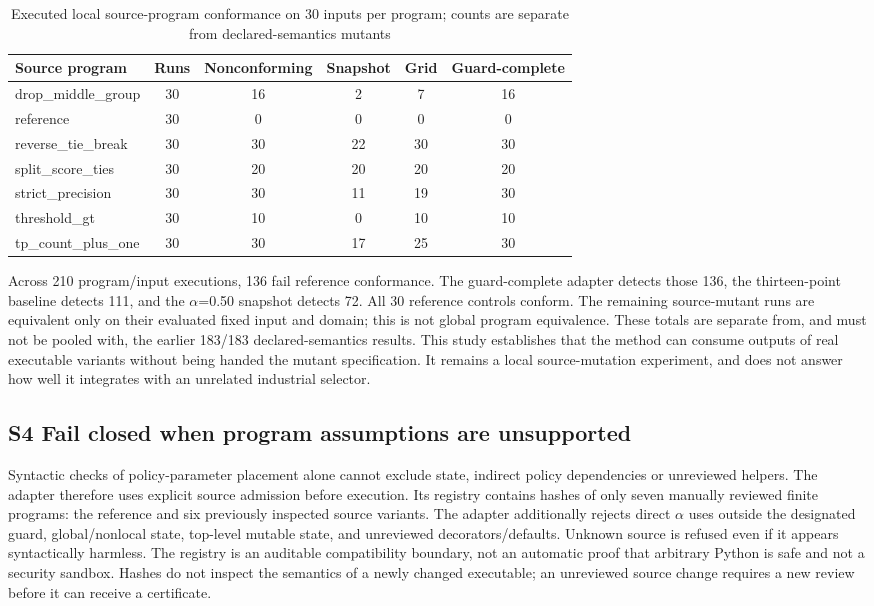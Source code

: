 \documentclass[11pt,a4paper]{article}
\theoremstyle{plain}
\theoremstyle{definition}
\theoremstyle{remark}
\begin{document}
\begin{table}[!htbp]
\caption{Executed local source-program conformance on 30 inputs per program; counts are separate from declared-semantics mutants}\label{tab:s1}
\centering
\footnotesize
\setlength{\tabcolsep}{3pt}
\renewcommand{\arraystretch}{1.15}
\begin{tabularx}{\textwidth}{@{} >{\raggedright\arraybackslash}X c c c c c @{}}
\toprule
\textbf{Source program} & \textbf{Runs} & \textbf{Nonconforming} & \textbf{Snapshot} & \textbf{Grid} & \textbf{Guard-complete} \\
\midrule
drop\_middle\_group & 30 & 16 & 2 & 7 & 16 \\
reference & 30 & 0 & 0 & 0 & 0 \\
reverse\_tie\_break & 30 & 30 & 22 & 30 & 30 \\
split\_score\_ties & 30 & 20 & 20 & 20 & 20 \\
strict\_precision & 30 & 30 & 11 & 19 & 30 \\
threshold\_gt & 30 & 10 & 0 & 10 & 10 \\
tp\_count\_plus\_one & 30 & 30 & 17 & 25 & 30 \\
\bottomrule
\end{tabularx}
\end{table}
\FloatBarrier

Across 210 program/input executions, 136 fail reference conformance. The guard-complete adapter detects those 136, the thirteen-point baseline detects 111, and the $\alpha$=0.50 snapshot detects 72. All 30 reference controls conform. The remaining source-mutant runs are equivalent only on their evaluated fixed input and domain; this is not global program equivalence. These totals are separate from, and must not be pooled with, the earlier 183/183 declared-semantics results. This study establishes that the method can consume outputs of real executable variants without being handed the mutant specification. It remains a local source-mutation experiment, and does not answer how well it integrates with an unrelated industrial selector.


\subsection*{S4 Fail closed when program assumptions are unsupported}\label{sec:s4}

Syntactic checks of policy-parameter placement alone cannot exclude state, indirect policy dependencies or unreviewed helpers. The adapter therefore uses explicit source admission before execution. Its registry contains hashes of only seven manually reviewed finite programs: the reference and six previously inspected source variants. The adapter additionally rejects direct $\alpha$ uses outside the designated guard, global/nonlocal state, top-level mutable state, and unreviewed decorators/defaults. Unknown source is refused even if it appears syntactically harmless. The registry is an auditable compatibility boundary, not an automatic proof that arbitrary Python is safe and not a security sandbox. Hashes do not inspect the semantics of a newly changed executable; an unreviewed source change requires a new review before it can receive a certificate.
\end{document}
